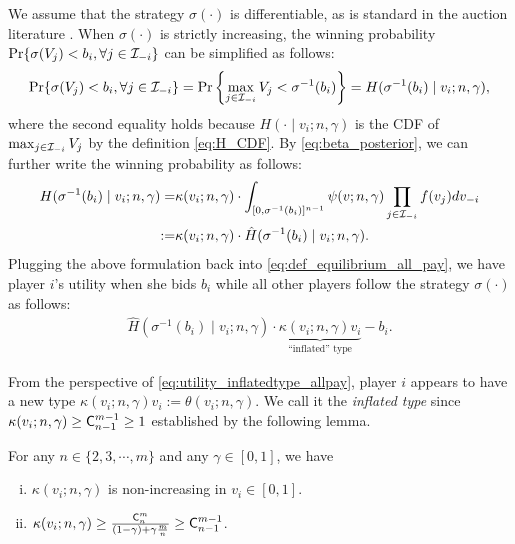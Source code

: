 We assume that the strategy $\sigma(\cdot)$ is differentiable, as is standard in the auction literature \citep{milgrom_1982_auctiontheory_competitive_bidding,milgrom_2004_putting_auctiontheory_to_work}.
When $\sigma(\cdot)$ is strictly increasing, the winning probability $\Pr\{\sigma(V_j)<b_i,\forall j\in \mathcal{I}_{-i}\}$
can be simplified as follows:
\begin{align*}
 \Pr\{\sigma(V_j)<b_i,\forall j\in \mathcal{I}_{-i}\}
  = \Pr\left\{ \max_{j\in \mathcal{I}_{-i}}V_j < \sigma^{-1}(b_i)\right\} 
  = H(\sigma^{-1}(b_i)\mid v_i;n,\gamma),
\end{align*}
where the second equality holds because $H(\cdot \mid v_i;n,\gamma)$ is the CDF of $\max_{j\in \mathcal{I}_{-i}}V_j$ by the definition \eqref{eq:H_CDF}.
By \eqref{eq:beta_posterior}, we can further write the winning probability as follows:
\begin{align*}
  H(\sigma^{-1}(b_i)\mid v_i;n,\gamma)
  =& \kappa(v_i;n,\gamma)\cdot \int_{[0,\sigma^{-1}(b_i)]^{n-1}} \psi(v;n,\gamma) \prod_{j\in \mathcal{I}_{-i}}f(v_j)dv_{-i}\\
  :=& \kappa(v_i;n,\gamma)\cdot \hat{H}(\sigma^{-1}(b_i)\mid v_i;n,\gamma).
\end{align*}
Plugging the above formulation back into \eqref{eq:def_equilibrium_all_pay}, we have player $i$'s utility when she bids $b_i$ while all other players follow the strategy $\sigma(\cdot)$ as follows:
\begin{align}
\label{eq:utility_inflatedtype_allpay}
 \hat{H}(\sigma^{-1}(b_i)\mid v_i;n,\gamma)\cdot \underbrace{\kappa(v_i;n,\gamma)v_i}_{\textrm{``inflated'' type}} - b_i.
\end{align}

From the perspective of \eqref{eq:utility_inflatedtype_allpay}, player $i$ appears to have a new type $\kappa(v_i;n,\gamma)v_i:=\theta(v_i;n,\gamma)$. We call it the \textit{inflated type} since $\kappa(v_i;n,\gamma)\geq \mathsf{C}^{m-1}_{n-1} \geq 1$ established by the following lemma.
\begin{lemma}
\label{lem:kappa_vi}
For any $n\in \{2,3,\cdots,m\}$ and any $\gamma\in[0,1]$, we have 
\begin{enumerate}[(i)]
    \item $\kappa(v_i;n,\gamma)$ is non-increasing in $v_i\in [0,1]$.
    \item $\kappa(v_i;n,\gamma)\geq \frac{\mathsf{C}^m_n}{(1-\gamma) + \gamma \frac{m}{n}} \geq \mathsf{C}^{m-1}_{n-1}$.
\end{enumerate}
\end{lemma}

